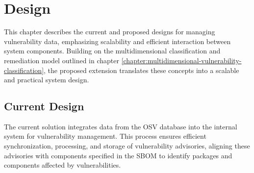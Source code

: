 \chapter{Design}
\label{chapter:design}

This chapter describes the current and proposed designs for managing vulnerability data, emphasizing scalability and efficient interaction between system components. Building on the multidimensional classification and remediation model outlined in chapter \ref{chapter:multidimensional-vulnerability-classification}, the proposed extension translates these concepts into a scalable and practical system design.

\section{Current Design}
\label{sec:current-design}

The current solution integrates data from the \ac{OSV} database into the internal system for vulnerability management. This process ensures efficient synchronization, processing, and storage of vulnerability advisories, aligning these advisories with components specified in the \ac{SBOM} to identify packages and components affected by vulnerabilities.

